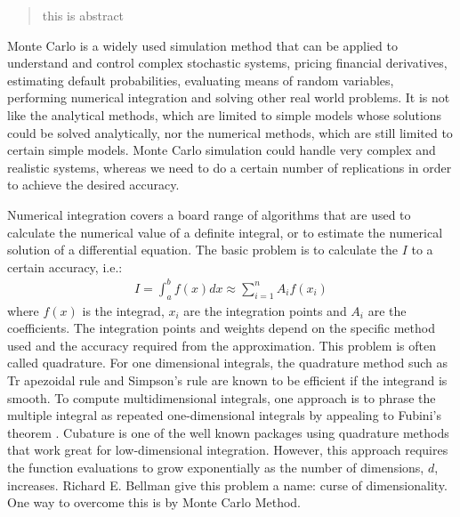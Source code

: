 \documentclass{iitthesis}
\begin{document}
\begin{abstract}           %
this is abstract
\end{abstract}
\textpages     %
\label{introduction}
Monte Carlo is a widely used simulation method that can be applied to understand and control complex stochastic systems, pricing financial derivatives, estimating default probabilities, evaluating means of random variables, performing numerical integration and solving other real world problems. It is not like the analytical methods, which are limited to simple models whose solutions could be solved analytically, nor the numerical methods, which are still limited to certain simple models. Monte Carlo simulation could handle very complex and realistic systems, whereas we need to do a certain number of replications in order to achieve the desired accuracy.

Numerical integration covers a board range of algorithms that are used to calculate the numerical value of a definite integral, or to estimate the numerical solution of a differential equation.
The basic problem is to calculate the $I$ to a certain accuracy, i.e.:
\begin{align}
I = \int_a^b f(x)dx \approx \sum_{i=1}^nA_i f(x_i)
\end{align}
where $f(x)$ is the integrad, $x_i$ are the integration points and $A_i$ are the coefficients. The integration points and weights depend on the specific method used and the accuracy required from the approximation. This problem is often called quadrature. For one dimensional integrals, the quadrature method such as Tr apezoidal rule and Simpson's rule are known to be efficient if the integrand is smooth. To compute multidimensional integrals, one approach is to phrase the multiple integral as repeated one-dimensional integrals by appealing to Fubini's theorem \cite{Fubini1907}. Cubature \cite{cubature} is one of the well known packages using quadrature methods that work great for low-dimensional integration. However, this approach requires the function evaluations to grow exponentially as the number of dimensions, $d$, increases. Richard E. Bellman give this problem a name: curse of dimensionality. One way to overcome this is by Monte Carlo Method.
\end{document}
